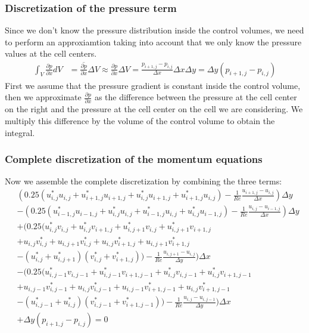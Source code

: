 \documentclass{article}
\begin{document}
\subsubsection*{Discretization of the pressure term}
Since we don't know the pressure distribution inside the control volumes, we need to perform an approxiamtion taking into account that we only know the pressure values at the cell centers.
\begin{equation}
\begin{aligned}
  \int_{V} \frac{\partial p}{\partial x} dV &= \overline{\frac{\partial p}{\partial x}} \Delta V 
  \approx \frac{\partial p}{\partial x} \Delta V 
  = \frac{p_{i+1,j} - p_{i,j}}{\Delta x} \Delta x \Delta y 
  = \Delta y (p_{i+1,j} - p_{i,j})
\end{aligned}
\end{equation}
First we assume that the pressure gradient is constant inside the control volume, then we approximate $\frac{\partial p}{\partial x}$ as the difference between the pressure at the cell center on the right and the pressure at the cell center on the cell we are considering. We multiply this difference by the volume of the control volume to obtain the integral.


\subsubsection*{Complete discretization of the momentum equations}
Now we assemble the complete discretization by combining the three terms:
\begin{equation}
  \begin{aligned}
    & (0.25 (u^*_{i,j} u_{i,j} + u^*_{i+1,j} u_{i+1,j} + u^*_{i,j} u_{i+1,j} + u^*_{i+1,j} u_{i,j}) - \frac{1}{Re} \frac{u_{i+1,j} - u_{i,j}}{\Delta x}) \Delta y  \\
    & - (0.25 (u^*_{i-1,j} u_{i-1,j} + u^*_{i,j} u_{i,j} + u^*_{i-1,j} u_{i,j} + u^*_{i,j} u_{i-1,j}) - \frac{1}{Re} \frac{u_{i,j} - u_{i-1,j}}{\Delta x}) \Delta y \\
    & + (0.25 (u^*_{i,j}v_{i,j} + u^*_{i,j}v_{i+1,j} + u^*_{i,j+1}v_{i,j} + u^*_{i,j+1}v_{i+1,j} \\
    & + u_{i,j}v^*_{i,j} + u_{i,j+1}v^*_{i,j} + u_{i,j}v^*_{i+1,j} + u_{i,j+1}v^*_{i+1,j} \\
    & - (u^*_{i,j} + u^*_{i,j+1}) (v^*_{i,j} + v^*_{i+1,j})) - \frac{1}{Re} \frac{u_{i,j+1} - u_{i,j}}{\Delta y}) \Delta x \\
    & - (0.25 (u^*_{i,j-1}v_{i,j-1} + u^*_{i,j-1}v_{i+1,j-1} + u^*_{i,j}v_{i,j-1} + u^*_{i,j}v_{i+1,j-1} \\
    & + u_{i,j-1}v^*_{i,j-1} + u_{i,j}v^*_{i,j-1} + u_{i,j-1}v^*_{i+1,j-1} + u_{i,j}v^*_{i+1,j-1} \\
    & - (u^*_{i,j-1} + u^*_{i,j}) (v^*_{i,j-1} + v^*_{i+1,j-1})) - \frac{1}{Re} \frac{u_{i,j} - u_{i,j-1}}{\Delta y}) \Delta x \\
    & + \Delta y (p_{i+1,j} - p_{i,j}) = 0
  \end{aligned}
\end{equation}
\end{document}
